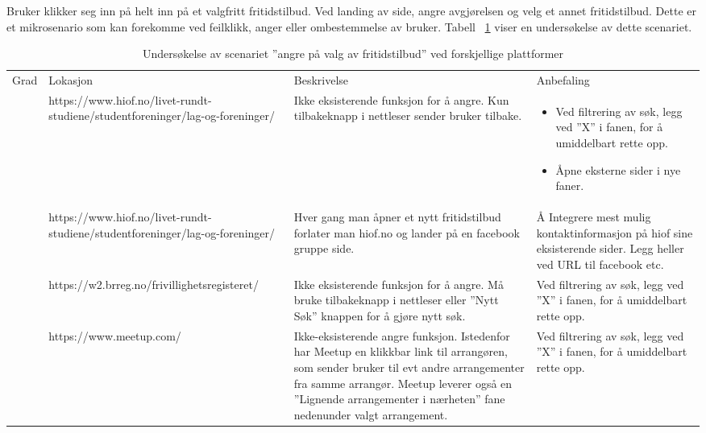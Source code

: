 Bruker klikker seg inn på helt inn på et valgfritt fritidstilbud. \newline Ved landing av side, angre avgjørelsen og velg et annet fritidstilbud.\newline
Dette er et mikrosenario som kan forekomme ved feilklikk, anger eller ombestemmelse av bruker. Tabell ~\ref{table:angreTilbud} viser en undersøkelse av dette scenariet.
\begin{center}
\begin{table}[H]
\begin{tabular}{ | m{0.7cm} | m{4cm}| m{4cm} | m{4cm} | } 
 \hline
 \centering Grad & Lokasjon & Beskrivelse & Anbefaling \\
 \centering 3 & \tiny https://www.hiof.no/livet-rundt-studiene/studentforeninger/lag-og-foreninger/ & \tiny Ikke eksisterende funksjon for å angre. Kun tilbakeknapp i nettleser sender bruker tilbake. & 
 \tiny 
 \begin{itemize} 
    \item Ved filtrering av søk, legg ved ''X'' i fanen, for å umiddelbart rette opp.
\item Åpne eksterne sider i nye faner.
\end{itemize}  \\
 \centering 3 & \tiny https://www.hiof.no/livet-rundt-studiene/studentforeninger/lag-og-foreninger/ & \tiny Hver gang man åpner et nytt fritidstilbud forlater man hiof.no og lander på en facebook gruppe side. & \tiny Å Integrere mest mulig kontaktinformasjon på hiof sine eksisterende sider. Legg heller ved URL til facebook etc.  \\
 \centering 3 & \tiny https://w2.brreg.no/frivillighetsregisteret/ & \tiny Ikke eksisterende funksjon for å angre. Må bruke tilbakeknapp i nettleser eller ''Nytt Søk'' knappen for å gjøre nytt søk. & \tiny Ved filtrering av søk, legg ved ''X'' i fanen, for å umiddelbart rette opp. \\
\centering 2 & \tiny https://www.meetup.com/ & \tiny Ikke-eksisterende angre funksjon. Istedenfor har Meetup en klikkbar link til arrangøren, som sender bruker til evt andre arrangementer fra samme arrangør. Meetup leverer også en ''Lignende arrangementer i nærheten'' fane nedenunder valgt arrangement.  & \tiny Ved filtrering av søk, legg ved ''X'' i fanen, for å umiddelbart rette opp. \\
 \hline
\end{tabular}
\caption{Undersøkelse av scenariet ''angre på valg av fritidstilbud'' ved forskjellige plattformer}
\label{table:angreTilbud}
\end{table}
\end{center}

